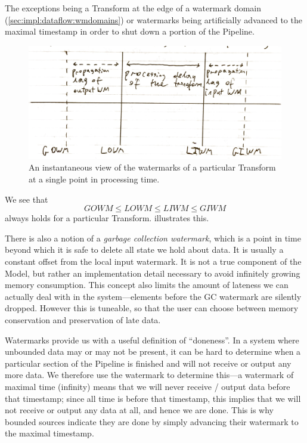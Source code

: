 \footnotetext
{
The exceptions being a Transform at the edge of a watermark domain (\cref{sec:impl:dataflow:wmdomains}) or watermarks being artificially advanced to the maximal timestamp in order to shut down a portion of the Pipeline.
} 

\begin{figure}[t]
	\includegraphics[width=\textwidth]{images/temp/lwm-transform-instantaneous}
	\caption{An instantaneous view of the watermarks of a particular Transform at a single point in processing time.}
	\label{fig:impl:lwm-instantaneous}
\end{figure}

We see that \[ \mathit{GOWM} \leq \mathit{LOWM} \leq \mathit{LIWM} \leq \mathit{GIWM} \] always holds for a particular Transform.  illustrates this.

There is also a notion of a \emph{garbage collection watermark}, which is a point in time beyond which it is safe to delete all state we hold about data.
It is usually a constant offset from the local input watermark.
It is not a true component of the Model, but rather an implementation detail necessary to avoid infinitely growing memory consumption.
This concept also limits the amount of lateness we can actually deal with in the system---elements before the GC watermark are silently dropped.
However this is tuneable, so that the user can choose between memory conservation and preservation of late data.

Watermarks provide us with a useful definition of ``doneness''.
In a system where unbounded data may or may not be present, it can be hard to determine when a particular section of the Pipeline is finished and will not receive or output any more data.
We therefore use the watermark to determine this---a watermark of maximal time (infinity) means that we will never receive / output data before that timestamp; since all time is before that timestamp, this implies that we will not receive or output any data at all, and hence we are done.
This is why bounded sources indicate they are done by simply advancing their watermark to the maximal timestamp.

